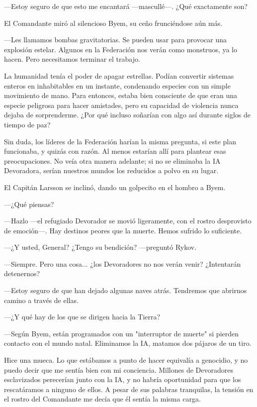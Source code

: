 —Estoy seguro de que esto me encantará —mascullé—. ¿Qué exactamente son?

El Comandante miró al silencioso Byem, su ceño frunciéndose aún más.

—Les llamamos bombas gravitatorias. Se pueden usar para provocar una explosión estelar. Algunos en la Federación nos verán como monstruos, ya lo hacen. Pero necesitamos terminar el trabajo.

La humanidad tenía el poder de apagar estrellas. Podían convertir sistemas enteros en inhabitables en un instante, condenando especies con un simple movimiento de mano. Para entonces, estaba bien consciente de que eran una especie peligrosa para hacer amistades, pero su capacidad de violencia nunca dejaba de sorprenderme. ¿Por qué incluso soñarían con algo así durante siglos de tiempo de paz?

Sin duda, los líderes de la Federación harían la misma pregunta, si este plan funcionaba, y quizás con razón. Al menos estarían allí para plantear esas preocupaciones. No veía otra manera adelante; si no se eliminaba la IA Devoradora, serían nuestros mundos los reducidos a polvo en su lugar.

El Capitán Larsson se inclinó, dando un golpecito en el hombro a Byem.

—¿Qué piensas?

—Hazlo —el refugiado Devorador se movió ligeramente, con el rostro desprovisto de emoción—. Hay destinos peores que la muerte. Hemos sufrido lo suficiente.

—¿Y usted, General? ¿Tengo su bendición? —preguntó Rykov.

—Siempre. Pero una cosa... ¿los Devoradores no nos verán venir? ¿Intentarán detenernos?

—Estoy seguro de que han dejado algunas naves atrás. Tendremos que abrirnos camino a través de ellas.

—¿Y qué hay de los que se dirigen hacia la Tierra?

—Según Byem, están programados con un "interruptor de muerte" si pierden contacto con el mundo natal. Eliminamos la IA, matamos dos pájaros de un tiro.

Hice una mueca. Lo que estábamos a punto de hacer equivalía a genocidio, y no puedo decir que me sentía bien con mi conciencia. Millones de Devoradores esclavizados perecerían junto con la IA, y no habría oportunidad para que los rescatáramos a ninguno de ellos. A pesar de sus palabras tranquilas, la tensión en el rostro del Comandante me decía que él sentía la misma carga.

